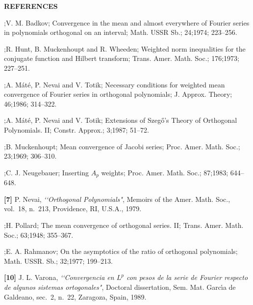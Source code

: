 \bigskip

\centerline {\bf REFERENCES}

\bigskip

\frenchspacing

;V. M. Badkov; Convergence in the mean and almost everywhere of Fourier
series in polynomials orthogonal on an interval; Math. USSR Sb.; 24;1974;
223--256.

;R. Hunt, B. Muckenhoupt and R. Wheeden; Weighted norm inequalities for
the conjugate function and Hilbert transform; Trans. Amer. Math. Soc.;
176;1973; 227--251.

;A. M\'at\'e, P. Nevai and V. Totik; Necessary conditions for weighted
mean convergence of Fourier series in orthogonal polynomials; J. Approx.
Theory; 46;1986; 314--322.

;A. M\'at\'e, P. Nevai and V. Totik; Extensions of Szeg\H o's
Theory of Orthogonal Polynomials. II; Constr. Approx.; 3;1987; 51--72.

;B. Muckenhoupt; Mean convergence of Jacobi series; Proc. Amer. Math.
Soc.; 23;1969; 306--310.

;C. J. Neugebauer; Inserting $A_p$ weights; Proc. Amer. Math. Soc.;
87;1983; 644--648.

\item {\bf [7]} {\rm P. Nevai, {\it \lq \lq Orthogonal Polynomials"}, Memoirs of
the Amer. Math. Soc., vol.~18, n.~213, Providence, RI, U.S.A., 1979.}

;H. Pollard; The mean convergence of orthogonal series. II; Trans. Amer.
Math. Soc.; 63;1948; 355--367.

;E. A. Rahmanov; On the asymptotics of the ratio of orthogonal
polynomials; Math. USSR. Sb.; 32;1977; 199--213.

\item {\bf [10]} {\rm J. L. Varona, {\it \lq \lq Convergencia en $L^p$ con pesos
de la serie de Fourier respecto de algunos sistemas ortogonales"}, Doctoral
dissertation, Sem. Mat. Garc\'\i a de Galdeano, sec.~2, n.~22, Zaragoza, Spain,
1989.}


\bye
